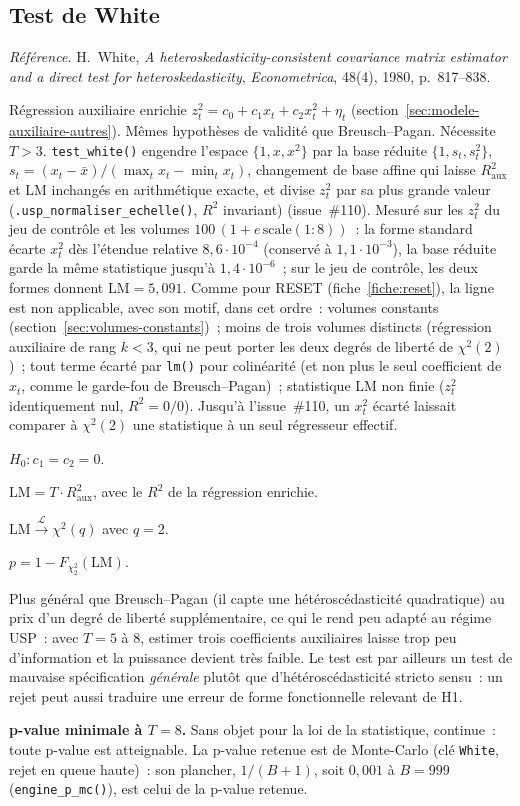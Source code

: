 \documentclass[a4paper,11pt]{article}
\newcommand{\code}[1]{\texttt{\small #1}}
\newcommand{\refl}[1]{{\small\textcolor{maincolor!70!black}{\textit{Référence.} #1}}\par\smallskip}
\newcounter{ficheid}
\newenvironment{fiche}[1]{%
  \stepcounter{ficheid}%
  \phantomsection
  \subsection{#1}%
  \label{fiche:\theficheid}%
}{%
  \end{description}\vspace{0.5em}%
}
\newcommand{\Cadre}{%
  \begin{description}[leftmargin=0pt, style=unboxed, itemsep=3pt, topsep=3pt, parsep=2pt]%
  \item[\textcolor{financeblue}{\textbf{1. Cadre, notations et hypothèses de validité (non testées).}}]}
\newcommand{\Hzero}{\item[\textcolor{financeblue}{\textbf{2. Hypothèse nulle.}}]}
\newcommand{\Stat}{\item[\textcolor{financeblue}{\textbf{3. Statistique de test.}}]}
\newcommand{\Loi}{\item[\textcolor{financeblue}{\textbf{4. Loi sous $H_0$.}}]}
\newcommand{\Pval}{\item[\textcolor{financeblue}{\textbf{5. p-value.}}]}
\newcommand{\Usage}{\item[\textcolor{financeblue}{\textbf{6. Usage et limites.}}]}
\newcommand{\Pertinence}{\item[\textcolor{financeblue}{\textbf{7. Pertinence et puissance à faible $T$.}}]}
\begin{document}
\begin{fiche}{Test de White}
\label{fiche:white}%
\refl{H.~White, \emph{A heteroskedasticity-consistent covariance matrix estimator and a direct
test for heteroskedasticity}, \emph{Econometrica}, 48(4), 1980, p.~817--838.}
\Cadre
Régression auxiliaire enrichie $z_t^2 = c_0 + c_1 x_t + c_2 x_t^2 + \eta_t$ (section~\ref{sec:modele-auxiliaire-autres}). Mêmes hypothèses de
validité que Breusch--Pagan. Nécessite $T > 3$. \code{test\_white()} engendre l'espace
$\{1, x, x^2\}$ par la base réduite $\{1, s_t, s_t^2\}$, $s_t = (x_t - \bar x)/(\max_t x_t -
\min_t x_t)$, changement de base affine qui laisse $R^2_{\text{aux}}$ et $\mathrm{LM}$ inchangés
en arithmétique exacte, et divise $z_t^2$ par sa plus grande valeur (\code{.usp\_normaliser\_echelle()},
$R^2$ invariant) (issue~\#110). Mesuré sur les $z_t^2$ du jeu de contrôle et les volumes
$100\,(1 + e\,\mathrm{scale}(1{:}8))$~: la forme standard écarte $x_t^2$ dès l'étendue relative
$8{,}6\cdot 10^{-4}$ (conservé à $1{,}1\cdot 10^{-3}$), la base réduite garde la même statistique
jusqu'à $1{,}4\cdot 10^{-6}$~; sur le jeu de contrôle, les deux formes donnent
$\mathrm{LM} = 5{,}091$. Comme pour RESET (fiche~\ref{fiche:reset}), la ligne est non applicable,
avec son motif, dans cet ordre~: volumes constants
(section~\ref{sec:volumes-constants})~; moins de trois volumes distincts (régression auxiliaire
de rang $k < 3$, qui ne peut porter les deux degrés de liberté de $\chi^2(2)$)~; tout terme
écarté par \code{lm()} pour colinéarité (et non plus le seul coefficient de $x_t$, comme le
garde-fou de Breusch--Pagan)~; statistique $\mathrm{LM}$ non finie ($z_t^2$ identiquement nul,
$R^2 = 0/0$). Jusqu'à l'issue~\#110, un $x_t^2$ écarté laissait comparer à $\chi^2(2)$ une
statistique à un seul régresseur effectif.
\Hzero
$H_0 : c_1 = c_2 = 0$.
\Stat
$\mathrm{LM} = T \cdot R^2_{\text{aux}}$, avec le $R^2$ de la régression enrichie.
\Loi
$\mathrm{LM} \xrightarrow{\ \mathcal{L}\ } \chi^2(q)$ avec $q = 2$.
\Pval
$p = 1 - F_{\chi^2_2}(\mathrm{LM})$.
\Usage
Plus général que Breusch--Pagan (il capte une hétéroscédasticité quadratique) au prix d'un degré
de liberté supplémentaire, ce qui le rend peu adapté au régime USP~: avec $T = 5$ à $8$, estimer
trois coefficients auxiliaires laisse trop peu d'information et la puissance devient très faible.
Le test est par ailleurs un test de mauvaise spécification \emph{générale} plutôt que
d'hétéroscédasticité stricto sensu~: un rejet peut aussi traduire une erreur de forme
fonctionnelle relevant de H1.
\Pertinence
\textbf{p-value minimale à $T = 8$.} Sans objet pour la loi de la statistique, continue~: toute p-value est atteignable. La p-value retenue est de Monte-Carlo (clé \code{White}, rejet en queue haute)~: son plancher, $1/(B+1)$, soit $0{,}001$ à $B = 999$ (\code{engine\_p\_mc()}), est celui de la p-value retenue.


\end{fiche}
\end{document}
